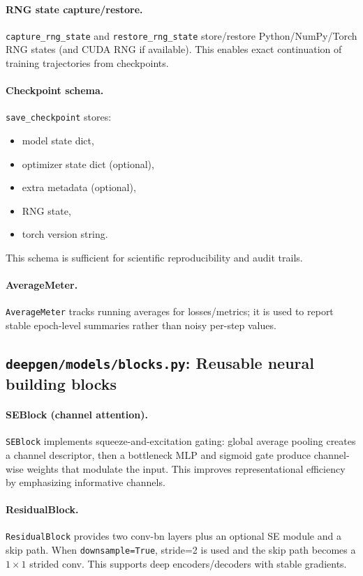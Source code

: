 \paragraph{RNG state capture/restore.}
\texttt{capture\_rng\_state} and \texttt{restore\_rng\_state} store/restore Python/NumPy/Torch RNG states (and CUDA RNG if available). This enables exact continuation of training trajectories from checkpoints.

\paragraph{Checkpoint schema.}
\texttt{save\_checkpoint} stores:
\begin{itemize}
  \item model state dict,
  \item optimizer state dict (optional),
  \item extra metadata (optional),
  \item RNG state,
  \item torch version string.
\end{itemize}
This schema is sufficient for scientific reproducibility and audit trails.

\paragraph{AverageMeter.}
\texttt{AverageMeter} tracks running averages for losses/metrics; it is used to report stable epoch-level summaries rather than noisy per-step values.

\subsection{\texttt{deepgen/models/blocks.py}: Reusable neural building blocks}
\paragraph{SEBlock (channel attention).}
\texttt{SEBlock} implements squeeze-and-excitation gating: global average pooling creates a channel descriptor, then a bottleneck MLP and sigmoid gate produce channel-wise weights that modulate the input. This improves representational efficiency by emphasizing informative channels.

\paragraph{ResidualBlock.}
\texttt{ResidualBlock} provides two conv-bn layers plus an optional SE module and a skip path. When \texttt{downsample=True}, stride=2 is used and the skip path becomes a $1\times 1$ strided conv. This supports deep encoders/decoders with stable gradients.

